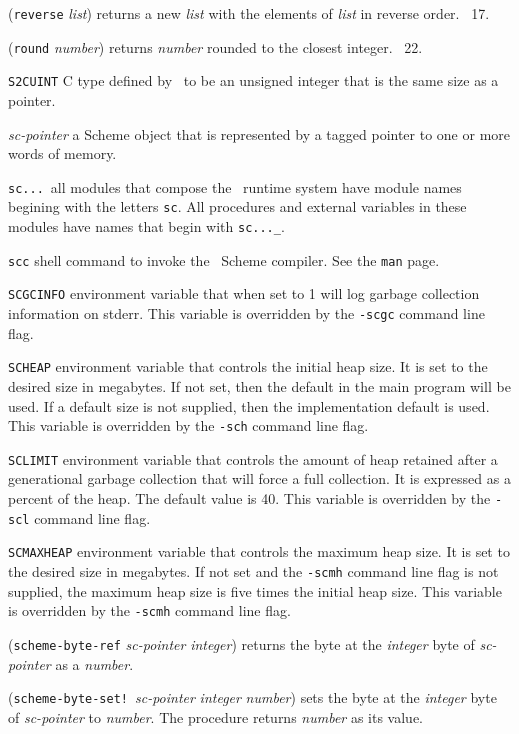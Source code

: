 \documentclass[10pt,twocolumn]{article}
\begin{document}
(\texttt{reverse} \emph{list}) returns a new \emph{list} with the
elements of \emph{list} in reverse order.  \RRRRRS~17.

(\texttt{round} \emph{number}) returns \emph{number} rounded to the
closest integer.  \RRRRRS~22.

\texttt{S2CUINT} C type defined by \StoC\ to be an unsigned integer
that is the same size as a pointer.

\emph{sc-pointer} a Scheme object that is represented by a tagged
pointer to one or more words of memory.

\texttt{sc...}\ all modules that compose the \StoC\ runtime system
have module names begining with the letters \texttt{sc}.  All
procedures and external variables in these modules have names that
begin with \texttt{sc...\_}.

\texttt{scc} shell command to invoke the \StoC\ Scheme compiler.  See
the \texttt{man} page.

\texttt{SCGCINFO} environment variable that when set to 1 will log
garbage collection information on stderr.  This variable is overridden
by the \texttt{-scgc} command line flag.

\texttt{SCHEAP} environment variable that controls the initial heap
size.  It is set to the desired size in megabytes.  If not set, then
the default in the main program will be used.  If a default size is
not supplied, then the implementation default is used.  This variable
is overridden by the \texttt{-sch} command line flag.

\texttt{SCLIMIT} environment variable that controls the amount of heap
retained after a generational garbage collection that will force a
full collection.  It is expressed as a percent of the heap.  The
default value is 40.  This variable is overridden by the \texttt{-scl}
command line flag.

\texttt{SCMAXHEAP} environment variable that controls the maximum heap
size.  It is set to the desired size in megabytes.  If not set and the
\texttt{-scmh} command line flag is not supplied, the maximum heap
size is five times the initial heap size. This variable is overridden
by the \texttt{-scmh} command line flag.

(\texttt{scheme-byte-ref} \emph{sc-pointer} \emph{integer}) returns
the byte at the \emph{integer} byte of \emph{sc-pointer} as a
\emph{number}.

(\texttt{scheme-byte-set!}\ \emph{sc-pointer} \emph{integer}
\emph{number}) sets the byte at the \emph{integer} byte of
\emph{sc-pointer} to \emph{number}.  The procedure returns
\emph{number} as its value.
\end{document}

